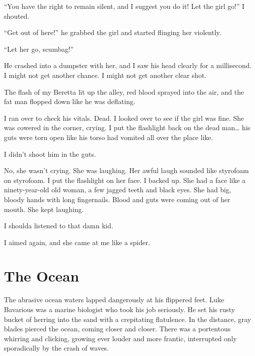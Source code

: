 ``You have the right to remain silent, and I suggest you do
it! Let the girl go!'' I shouted.



``Get out of here!'' he grabbed the girl and started
flinging her violently.



``Let her go, scumbag!''



He crashed into a dumpster with her, and I saw his head clearly for
a millisecond. I might not get another chance. I might not get
another clear shot.



The flash of my Beretta lit up the alley, red blood sprayed into
the air, and the fat man flopped down like he was deflating.



I ran over to check his vitals. Dead. I looked over to see if the
girl was fine. She was cowered in the corner, crying. I put the
flashlight back on the dead man{\ldots} his guts were torn open like his
torso had vomited all over the place like.



I didn't shoot him in the guts.



No, she wasn't crying. She was laughing. Her awful laugh
sounded like styrofoam on styrofoam. I put the flashlight on her
face. I backed up. She had a face like a ninety-year-old old woman,
a few jagged teeth and black eyes. She had big, bloody hands with
long fingernails. Blood and guts were coming out of her mouth. She
kept laughing.



I shoulda listened to that damn kid.



I aimed again, and she came at me like a spider.


 



\chapter{The Ocean}

The abrasive ocean waters lapped dangerously at his flippered feet.
Luke Bavarious was a marine biologist who took his job seriously.
He set his rusty bucket of herring into the sand with a crepitating
flatulence. In the distance, gray blades pierced the ocean, coming
closer and closer. There was a portentous whirring and clicking,
growing ever louder and more frantic, interrupted only sporadically
by the crash of waves.




